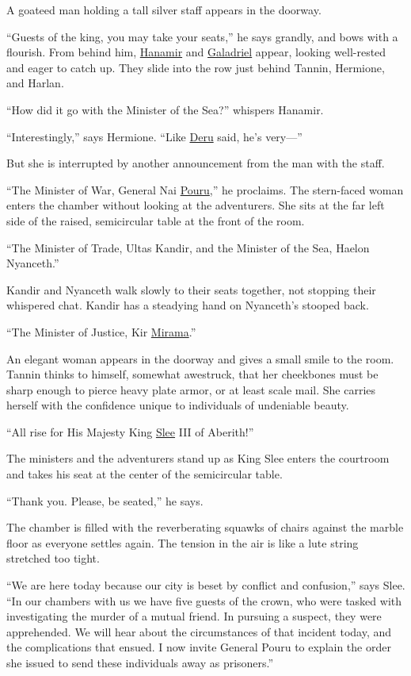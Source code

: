 \documentclass[smalldemyvopaper,11pt,twoside,onecolumn,openright,extrafontsizes]{memoir}
\begin{document}
A goateed man holding a tall silver staff appears in the doorway.

``Guests of the king, you may take your seats,'' he says grandly, and
bows with a flourish. From behind him,
\href{/characters/hanamir/}{Hanamir} and
\href{/characters/galadriel/}{Galadriel} appear, looking well-rested and
eager to catch up. They slide into the row just behind Tannin, Hermione,
and Harlan.

``How did it go with the Minister of the Sea?'' whispers Hanamir.

``Interestingly,'' says Hermione. ``Like \href{/characters/deru/}{Deru}
said, he's very---''

But she is interrupted by another announcement from the man with the
staff.

``The Minister of War, General Nai \href{/characters/pouru/}{Pouru},''
he proclaims. The stern-faced woman enters the chamber without looking
at the adventurers. She sits at the far left side of the raised,
semicircular table at the front of the room.

``The Minister of Trade, Ultas Kandir, and the Minister of the Sea,
Haelon Nyanceth.''

Kandir and Nyanceth walk slowly to their seats together, not stopping
their whispered chat. Kandir has a steadying hand on Nyanceth's stooped
back.

``The Minister of Justice, Kir \href{/characters/mirama/}{Mirama}.''

An elegant woman appears in the doorway and gives a small smile to the
room. Tannin thinks to himself, somewhat awestruck, that her cheekbones
must be sharp enough to pierce heavy plate armor, or at least scale
mail. She carries herself with the confidence unique to individuals of
undeniable beauty.

``All rise for His Majesty King \href{/characters/slee/}{Slee} III of
Aberith!''

The ministers and the adventurers stand up as King Slee enters the
courtroom and takes his seat at the center of the semicircular table.

``Thank you. Please, be seated,'' he says.

The chamber is filled with the reverberating squawks of chairs against
the marble floor as everyone settles again. The tension in the air is
like a lute string stretched too tight.

``We are here today because our city is beset by conflict and
confusion,'' says Slee. ``In our chambers with us we have five guests of
the crown, who were tasked with investigating the murder of a mutual
friend. In pursuing a suspect, they were apprehended. We will hear about
the circumstances of that incident today, and the complications that
ensued. I now invite General Pouru to explain the order she issued to
send these individuals away as prisoners.''
\end{document}
